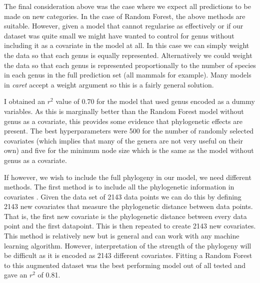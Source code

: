\documentclass[12pt,]{article}
\begin{document}
The final consideration above was the case where we expect all predictions to be made on new categories.
In the case of Random Forest, the above methods are suitable.
However, given a model that cannot regularise as effectively or if our dataset was quite small we might have wanted to control for genus without including it as a covariate in the model at all.
In this case we can simply weight the data so that each genus is equally represented.
Alternatively we could weight the data so that each genus is represented proportionally to the number of species in each genus in the full prediction set (all mammals for example).
Many models in \emph{caret} accept a weight argument so this is a fairly general solution.

I obtained an \(r^2\) value of 0.70 for the model that used genus encoded as a  dummy variables.
As this is marginally better than the Random Forest model without genus as a covariate, this provides some evidence that phylogenetic effects are present.
The best hyperparameters were 500 for the number of randomly selected covariates  (which implies that many of the genera are not very useful on their own) and five for the minimum node size which is the same as the model without genus as a covariate.

If however, we wish to include the full phylogeny in our model, we need different methods.
The first method is to include all the phylogenetic information in covariates \citep{hengl2018random}.
Given the data set of 2143 data points we can do this by defining 2143 new covariates that measure the phylogenetic distance between data points.
That is, the first new covariate is the phylogenetic distance between every data point and the first datapoint.
This is then repeated to create 2143 new covariates.
This method is relatively new but is general and can work with any machine learning algorithm.
However, interpretation of the strength of the phylogeny will be difficult as it is encoded as 2143 different covariates.
Fitting a Random Forest to this augmented dataset was the best performing model out of all tested and gave an \(r^2\) of 0.81.
\end{document}
